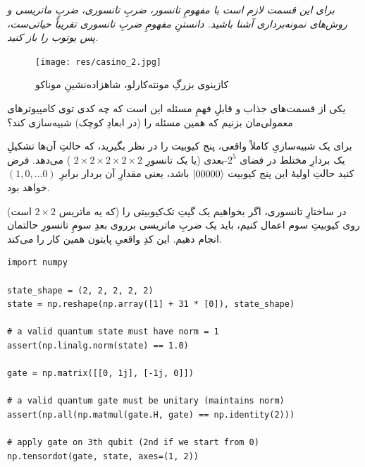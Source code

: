 \documentclass[11pt]{article}
\begin{document}
\begin{center}
\begin{minipage}[H]{0.6\textwidth}
\emph{
برای این قسمت لازم است با مفهومِ تانسور، ضربِ تانسوری، ضربِ ماتریسی و روش‌های نمونه‌برداری آشنا باشید. دانستنِ مفهومِ ضربِ تانسوری تقریباً حیاتی‌ست، پس یوتوب را باز کنید.}
\end{minipage}
\end{center}

\begin{figure}[H]
\centering
\texttt{[image: res/casino\_2.jpg]}
\caption{کازینوی بزرگِ مونته‌کارلو، شاهزاده‌نشینِ موناکو}
\end{figure}

یکی از قسمت‌های جذاب و قابلِ فهمِ مسئله این است که چه کدی توی کامپیوترهای معمولی‌مان بزنیم که همین مسئله را (در ابعادِ کوچک) شبیه‌سازی کند؟

برای یک شبیه‌سازیِ کاملاً واقعی، پنج کیوبیت را در نظر بگیرید، که حالتِ آن‌ها تشکیلِ یک بردارِ مختلط در فضای $2^5$-بعدی (یا یک تانسورِ 
$2\times 2\times 2\times 2\times 2$
) می‌دهد. فرض کنید حالتِ اولیهٔ این پنج کیوبیت 
$\ket{00000}$
باشد، یعنی مقدارِ آن بردار برابرِ
$ (1, 0, \dots 0) $
خواهد بود.

در ساختارِ تانسوری، اگر بخواهیم یک گیتِ تک‌کیوبیتی را (که یه ماتریس 
$2 \times 2$
است) روی کیوبیتِ سوم اعمال کنیم، باید یک ضربِ ماتریسی برروی بعدِ سومِ تانسورِ حالتمان انجام دهیم. این کدِ واقعیِ پایتون همین‌ کار را می‌کند.


        
\begin{latin}
\begin{lstlisting}
import numpy

state_shape = (2, 2, 2, 2, 2)
state = np.reshape(np.array([1] + 31 * [0]), state_shape)

# a valid quantum state must have norm = 1
assert(np.linalg.norm(state) == 1.0)

gate = np.matrix([[0, 1j], [-1j, 0]])

# a valid quantum gate must be unitary (maintains norm)
assert(np.all(np.matmul(gate.H, gate) == np.identity(2)))

# apply gate on 3th qubit (2nd if we start from 0) 
np.tensordot(gate, state, axes=(1, 2))

\end{lstlisting}
\end{latin}
\end{document}
